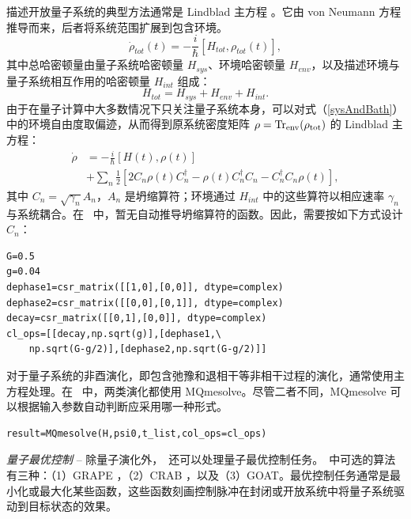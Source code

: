 描述开放量子系统的典型方法通常是 Lindblad 主方程 \cite{lindblad1976generators}。它由 von Neumann 方程推导而来，后者将系统范围扩展到包含环境。
\begin{equation}
    \dot{\rho}_{tot}(t)=-\frac{i}{\hbar}\left[H_{tot},\rho_{tot}(t)\right],
    \label{sysAndBath}
\end{equation}
其中总哈密顿量由量子系统哈密顿量 $H_{sys}$、环境哈密顿量 $H_{env}$，以及描述环境与量子系统相互作用的哈密顿量 $H_{int}$ 组成：
\begin{equation}
    H_{tot}=H_{sys}+H_{env}+H_{int}.
\end{equation}
由于在量子计算中大多数情况下只关注量子系统本身，可以对式（\ref{sysAndBath}）中的环境自由度取偏迹，从而得到原系统密度矩阵 $\rho=\rm{Tr}_{env}(\rho_{tot})$ 的 Lindblad 主方程：
\begin{equation}
    \begin{split}
        \dot{\rho}&=-\frac{i}{\hbar}\left[H(t),\rho(t)\right]\\
        &+\sum_{n}\frac{1}{2}\left[2C_{n}\rho(t)C^{\dagger}_{n}-\rho(t)C_{n}^{\dagger}C_{n}-C_{n}^{\dagger}C_{n}\rho(t)\right],
    \end{split}
\end{equation}
其中 $C_{n}=\sqrt{\gamma_{n}}A_{n}$，$A_n$ 是坍缩算符；环境通过 $H_{int}$ 中的这些算符以相应速率 $\gamma_{n}$ 与系统耦合。在 \MindQuantum\ 中，暂无自动推导坍缩算符的函数。因此，需要按如下方式设计 $C_{n}$：
\begin{lstlisting}
G=0.5
g=0.04
dephase1=csr_matrix([[1,0],[0,0]], dtype=complex)
dephase2=csr_matrix([[0,0],[0,1]], dtype=complex)
decay=csr_matrix([[0,1],[0,0]], dtype=complex)
cl_ops=[[decay,np.sqrt(g)],[dephase1,\
    np.sqrt(G-g/2)],[dephase2,np.sqrt(G-g/2)]]
\end{lstlisting}
对于量子系统的非酉演化，即包含弛豫和退相干等非相干过程的演化，通常使用主方程处理。在 \MindQuantum\ 中，两类演化都使用 MQmesolve。尽管二者不同，MQmesolve 可以根据输入参数自动判断应采用哪一种形式。
\begin{lstlisting}
result=MQmesolve(H,psi0,t_list,col_ops=cl_ops)
\end{lstlisting}

\textit{量子最优控制} -- 除量子演化外，\MindQuantum\ 还可以处理量子最优控制任务。\MindQuantum\ 中可选的算法有三种：（1）GRAPE \cite{GRAPE_0, GRAPE_2}，（2）CRAB \cite{CRAB_0, CRAB_1}，以及（3）GOAT。最优控制任务通常是最小化或最大化某些函数，这些函数刻画控制脉冲在封闭或开放系统中将量子系统驱动到目标状态的效果。

